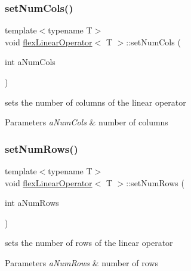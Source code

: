 \subsubsection{\texorpdfstring{set\+Num\+Cols()}{setNumCols()}}
{\footnotesize\ttfamily template$<$typename T$>$ \\
void \hyperlink{classflex_linear_operator}{flex\+Linear\+Operator}$<$ T $>$\+::set\+Num\+Cols (\begin{DoxyParamCaption}\item[{int}]{a\+Num\+Cols }\end{DoxyParamCaption})\hspace{0.3cm}{\ttfamily [inline]}}



sets the number of columns of the linear operator 


\begin{DoxyParams}{Parameters}
{\em a\+Num\+Cols} & number of columns \\
\hline
\end{DoxyParams}
\mbox{\label{classflex_linear_operator_a14ea80aaa2a6d3c468f6bf38452f1001}} 
\subsubsection{\texorpdfstring{set\+Num\+Rows()}{setNumRows()}}
{\footnotesize\ttfamily template$<$typename T$>$ \\
void \hyperlink{classflex_linear_operator}{flex\+Linear\+Operator}$<$ T $>$\+::set\+Num\+Rows (\begin{DoxyParamCaption}\item[{int}]{a\+Num\+Rows }\end{DoxyParamCaption})\hspace{0.3cm}{\ttfamily [inline]}}



sets the number of rows of the linear operator 


\begin{DoxyParams}{Parameters}
{\em a\+Num\+Rows} & number of rows \\
\hline
\end{DoxyParams}
\mbox{\label{classflex_linear_operator_a883982edf3be857815d2095e53f76e75}} 
